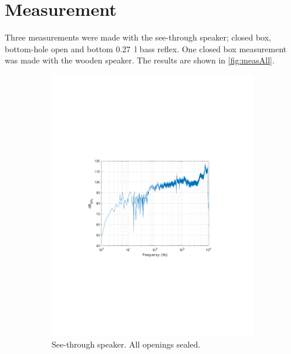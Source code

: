 \section{Measurement}
Three measurements were made with the see-through speaker; closed box, bottom-hole open and bottom \SI{0.27}{\litre} bass reflex. One closed box measurement was made with the wooden speaker. The results are shown in \cref{fig:measAll}.

\begin{figure}
	\centering
	\begin{subfigure}{.5\textwidth}
		\centering
		\includegraphics[width=.9\linewidth, clip, trim={3.9cm 8.4cm 4.5cm 9cm}]{gfx/SpeakerMeas/PGclosed.pdf}
		\caption{See-through speaker. All openings sealed.}
		\label{fig:measPGclose}
	\end{subfigure}%
	\begin{subfigure}{.5\textwidth}
		\centering

\end{subfigure}
\end{figure}
